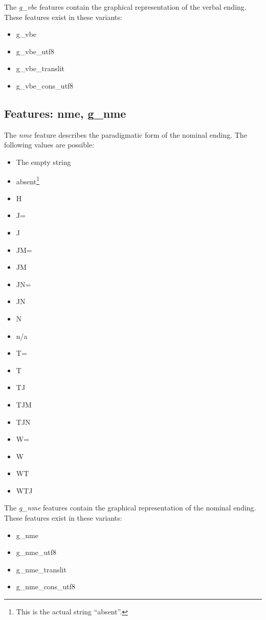 \documentclass[11pt,oneside,a4paper]{memoir}
\begin{document}
The \emph{g\_vbe} features contain the graphical representation of the verbal ending.
These features exist in these variants:

\begin{itemize}
\item g\_vbe
\item g\_vbe\_utf8
\item g\_vbe\_translit
\item g\_vbe\_cons\_utf8
\end{itemize}

\subsection{Features: nme, g\_nme}

The \emph{nme} feature describes the paradigmatic form of the nominal ending. The following
values are possible:

\begin{itemize}
\item The empty string
\item absent\footnote{This is the actual string ``absent''.}
\item H
\item J=
\item J
\item JM=
\item JM
\item JN=
\item JN
\item N
\item n/a
\item T=
\item T
\item TJ
\item TJM
\item TJN
\item W=
\item W
\item WT
\item WTJ
\end{itemize}

The \emph{g\_nme} features contain the graphical representation of the nominal ending.
These features exist in these variants:

\begin{itemize}
\item g\_nme
\item g\_nme\_utf8
\item g\_nme\_translit
\item g\_nme\_cons\_utf8
\end{itemize}
\end{document}
